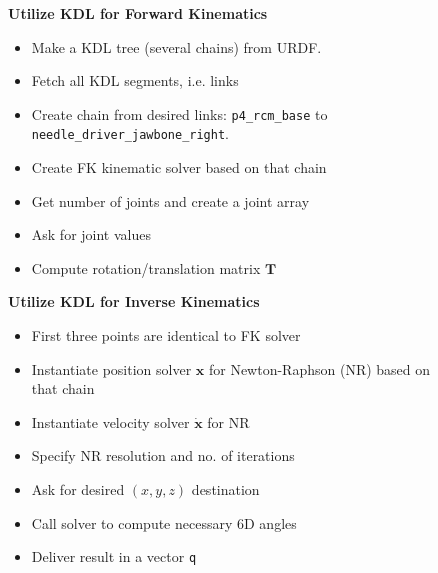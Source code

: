 \begin{figure}[H]
\centering
\begin{minipage}{0.48\textwidth}
\textbf{Utilize KDL for Forward Kinematics}
\begin{itemize}[leftmargin=*]
	\itemsep-0.5mm
\item Make a KDL tree (several chains) from URDF.
\item Fetch all KDL segments, i.e. links
\item Create chain from desired links: \texttt{p4\_rcm\_base} to \texttt{needle\_driver\_jawbone\_right}.
\item Create FK kinematic solver based on that chain
\item Get number of joints and create a joint array
\item Ask for joint values
\item Compute rotation/translation matrix $\mathbf{T}$
\end{itemize}
\end{minipage}
\hspace{0.3cm}
\begin{minipage}{0.48\textwidth}
\textbf{Utilize KDL for Inverse Kinematics}
\begin{itemize}[leftmargin=*]
	\itemsep-0.5mm
\item First three points are identical to FK solver
\item Instantiate position solver $\mathbf{x}$ for Newton-Raphson (NR) based on that chain
\item Instantiate velocity solver $\dot{\mathbf{x}}$ for NR
\item Specify NR resolution and no. of iterations
\item Ask for desired $(x,y,z)$ destination
\item Call solver to compute necessary 6D angles 
\item Deliver result in a vector \texttt{q}
\end{itemize}
\end{minipage}
\end{figure}
